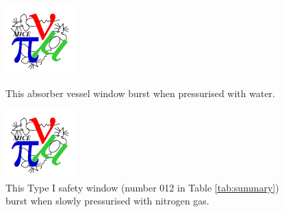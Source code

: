 \begin{figure}
  \begin{minipage}{0.46\textwidth}
    \centerline{\includegraphics*[height=0.76\textwidth]{Window_Burst2}}
    \caption{
      This absorber vessel window burst when pressurised with water.
    }  
    \label{Burst_Absorber}
  \end{minipage} \hfill
  \begin{minipage}{0.46\textwidth}
    \centerline{\includegraphics*[height=0.75\textwidth]{Safety_Burst2}}
    \caption{
      This Type I safety window (number 012 in Table \ref{tab:summary})
      burst when slowly pressurised with nitrogen gas.
    } 
    \label{Burst_Safety}
  \end{minipage}
\end{figure}

